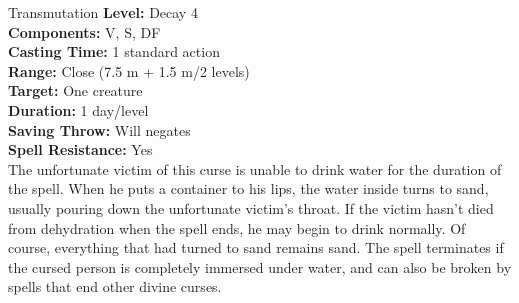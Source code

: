 {Transmutation}
{
	\textbf{Level:}
	Decay 4\\
	\textbf{Components:}
	V, S, DF\\
	\textbf{Casting Time:}
	1 standard action\\
	\textbf{Range:}
	Close (7.5 m + 1.5 m/2 levels)\\
	\textbf{Target:}
	One creature\\
	\textbf{Duration:}
	1 day/level\\
	\textbf{Saving Throw:}
	Will negates\\
	\textbf{Spell Resistance:}
	Yes\\
}
{
	The unfortunate victim of this curse is unable to drink water for the duration of the spell. When he puts a container to his lips, the water inside turns to sand, usually pouring down the unfortunate victim's throat. If the victim hasn't died from dehydration when the spell ends, he may begin to drink normally. Of course, everything that had turned to sand remains sand. The spell terminates if the cursed person is completely immersed under water, and can also be broken by spells that end other divine curses.
}
